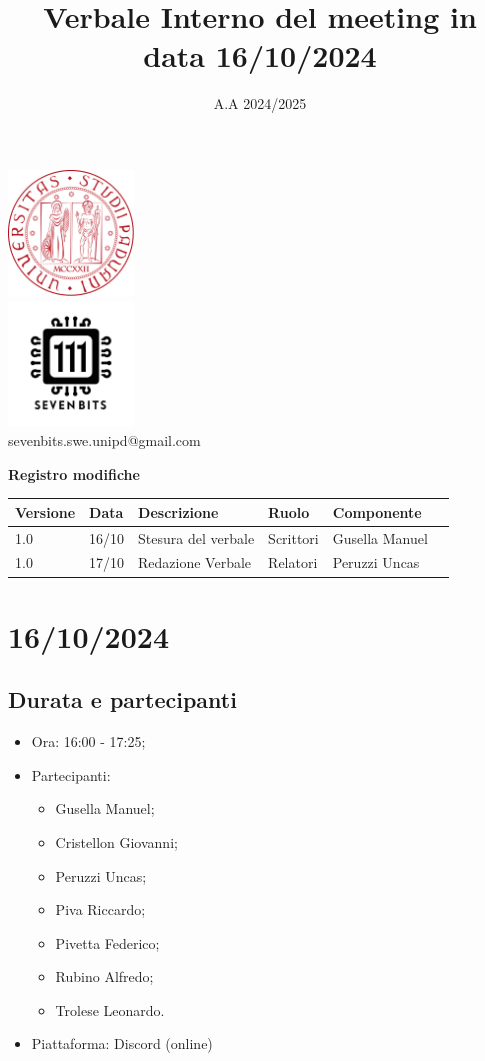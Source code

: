 \documentclass[12pt]{article}
\title{Verbale Interno del meeting in data 16/10/2024}
\date{A.A 2024/2025}
\begin{document}
\maketitle
\center 
\includegraphics[width=0.25\textwidth]{LogoUnipd}\\
\includegraphics[width=0.25\textwidth]{Sevenbitslogo}\\
sevenbits.swe.unipd@gmail.com\\
\vspace{2mm}

\textbf{Registro modifiche}\\
\vspace{2mm}
\begin{tabular}{|l|l|l|l|l|l|}
\hline
\textbf{Versione} & \textbf{Data} & \textbf{Descrizione} & \textbf{Ruolo} & \textbf{Componente} \\
\hline
1.0 & 16/10 & Stesura del verbale & Scrittori & Gusella Manuel\\
\hline
1.0 & 17/10 & Redazione Verbale & Relatori & Peruzzi Uncas \\
\hline
\end{tabular}

\raggedright
\tableofcontents
\newpage
\section{16/10/2024}
\subsection{Durata e partecipanti}
\begin{itemize}
\item Ora: 16:00 - 17:25;
\item Partecipanti: 	
	\begin{itemize}
	\item Gusella Manuel;
	\item Cristellon Giovanni;
	\item Peruzzi Uncas;
	\item Piva Riccardo;
	\item Pivetta Federico;
	\item Rubino Alfredo;
	\item Trolese Leonardo.
	\end{itemize}
\item Piattaforma: Discord (online)
\end{itemize}
\end{document}
